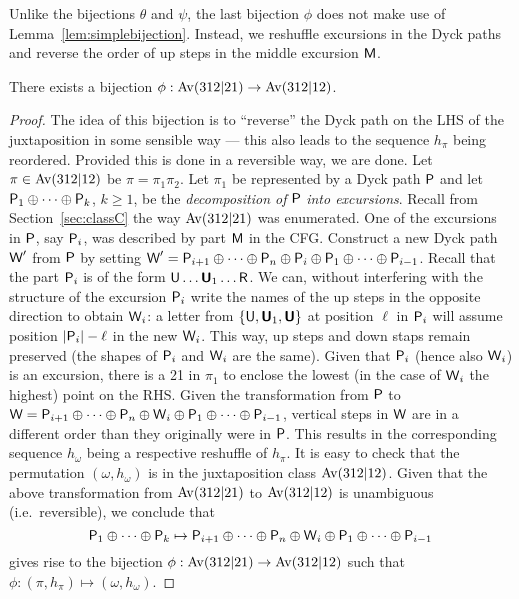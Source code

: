 \documentclass[12pt, a4paper, twoside]{report}
\begin{document}
Unlike the bijections $\theta$ and $\psi$, the last bijection $\phi$ does not make use of Lemma~\ref{lem:simplebijection}. Instead, we reshuffle excursions in the Dyck paths and reverse the order of up steps in the middle excursion $\mathsf{M}$. 

\begin{theorem}
\label{thm:phi}
There exists a bijection $\phi: \mathrm{Av}(312|21) \to \mathrm{Av}(312|12)$. 
\end{theorem}
\begin{proof}
The idea of this bijection is to ``reverse'' the Dyck path on the LHS of the juxtaposition in some sensible way --- this also leads to the sequence $h_\pi$ being reordered. Provided this is done in a reversible way, we are done. Let $\pi \in \mathrm{Av}(312|12)$ be $\pi = \pi_1\pi_2$. Let $\pi_1$ be represented by a Dyck path $\textsf{P}$ and let $\textsf{P}_1 \oplus \cdots \oplus \textsf{P}_k$, $k\geq 1$, be the \emph{decomposition of }$\textsf{P}$\emph{ into excursions}. Recall from Section~\ref{sec:classC} the way $\mathrm{Av}(312|21)$ was enumerated. One of the excursions in $\textsf{P}$, say $\textsf{P}_i$, was described by part $\mathsf{M}$ in the CFG. Construct a new Dyck path $\textsf{W}'$ from $\textsf{P}$ by setting $\textsf{W}' = \textsf{P}_{i+1}\oplus \cdots \oplus \textsf{P}_{n} \oplus \textsf{P}_i \oplus \textsf{P}_1\oplus \cdots \oplus \textsf{P}_{i-1}$. Recall that the part $\textsf{P}_i$ is of the form $\mathsf{U}\ldots\textbf{\textsf{U}}_1\ldots \mathsf{R}$. We can, without interfering with the structure of the excursion $\textsf{P}_i$ write the names of the up steps in the opposite direction to obtain $\textsf{W}_i$: a letter from $\{\mathsf{U}, \textbf{\textsf{U}}_1, \textbf{\textsf{U}}\}$ at position $\ell$ in $\textsf{P}_i$ will assume position $|\textsf{P}_i|-\ell$ in the new $\textsf{W}_i$. This way, up steps and down staps remain preserved (the shapes of $\textsf{P}_i$ and $\textsf{W}_i$ are the same). Given that $\textsf{P}_i$ (hence also $\textsf{W}_i$) is an excursion, there is a 21 in $\pi_1$ to enclose the lowest (in the case of $\textsf{W}_i$ the highest) point on the RHS. Given the transformation from $\textsf{P}$ to $\textsf{W} = \textsf{P}_{i+1}\oplus \cdots \oplus \textsf{P}_{n} \oplus \textsf{W}_i \oplus \textsf{P}_1\oplus \cdots \oplus \textsf{P}_{i-1}$, vertical steps in $\textsf{W}$ are in a different order than they originally were in $\textsf{P}$. This results in the corresponding sequence $h_\omega$ being a respective reshuffle of $h_\pi$. It is easy to check that the permutation $(\omega,h_\omega)$ is in the juxtaposition class $\mathrm{Av}(312|12)$. Given that the above transformation from $\mathrm{Av}(312|21)$ to $\mathrm{Av}(312|12)$ is unambiguous (i.e.~reversible), we conclude that 
$$\textsf{P}_1 \oplus \cdots \oplus \textsf{P}_k \mapsto \textsf{P}_{i+1}\oplus \cdots \oplus \textsf{P}_{n} \oplus \textsf{W}_i \oplus \textsf{P}_1\oplus \cdots \oplus \textsf{P}_{i-1}$$
gives rise to the bijection $\phi: \mathrm{Av}(312|21) \to \mathrm{Av}(312|12)$ such that $\phi: (\pi,h_\pi) \mapsto (\omega,h_\omega)$.
\end{proof}
\end{document}

